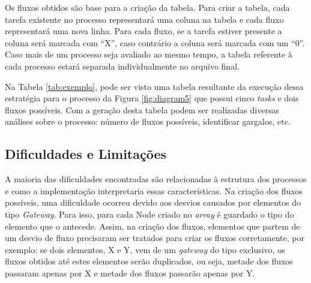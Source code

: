 \documentclass[12pt]{article}
\begin{document}
Os fluxos obtidos são base para a criação da tabela. Para criar a tabela, cada tarefa existente no processo representará uma coluna na tabela e cada fluxo representará uma nova linha. Para cada fluxo, se a tarefa estiver presente a coluna será marcada com ``X'', caso contrário a coluna será marcada com um ``0''. Caso mais de um processo seja avaliado ao mesmo tempo, a tabela referente à cada processo estará separada individualmente no arquivo final. 

Na Tabela \ref{tab:exemplo}, pode ser visto uma tabela resultante da execução dessa estratégia para o processo da Figura \ref{fig:diagram5} que possui cinco \emph{tasks} e dois fluxos possíveis. Com a geração desta tabela podem ser realizadas diversas análises sobre o processo: número de fluxos possíveis, identificar gargalos, etc.

\begin{table}[]
\centering
\caption{Exemplo de tabela resultante}
\label{tab:exemplo}
\end{table}

\subsection{Dificuldades e Limitações}

A maioria das dificuldades encontradas são relacionadas à estrutura dos processos e como a implementação interpretaria essas características. Na criação dos fluxos possíveis, uma dificuldade ocorreu devido aos desvios causados por elementos do tipo \emph{Gateway}. Para isso, para cada Node criado no \emph{array} é guardado o tipo do elemento que o antecede. Assim, na criação dos fluxos, elementos que partem de um desvio de fluxo precisaram ser tratados para criar os fluxos corretamente, por exemplo: se dois elementos, X e Y, vem de um \emph{gateway} do tipo  exclusivo, os fluxos obtidos até estes elementos serão duplicados, ou seja, metade dos fluxos passaram apenas por X e metade dos fluxos passarão apenas por Y.
\end{document}
